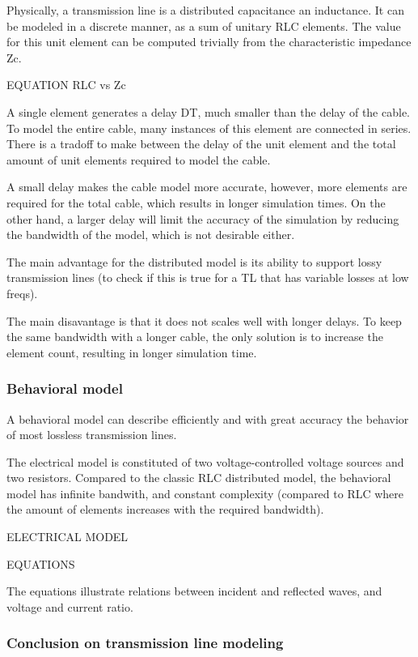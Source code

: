 Physically, a transmission line is a distributed capacitance an inductance.
It can be modeled in a discrete manner, as a sum of unitary RLC elements.
The value for this unit element can be computed trivially from the characteristic impedance \gls{Zc}.

EQUATION RLC vs Zc

A single element generates a delay DT, much smaller than the delay of the cable.
To model the entire cable, many instances of this element are connected in series.
There is a tradoff to make between the delay of the unit element and the total amount of unit elements required to model the cable.

A small delay makes the cable model more accurate, however, more elements are required for the total cable, which results in longer simulation times.
On the other hand, a larger delay will limit the accuracy of the simulation by reducing the bandwidth of the model, which is not desirable either.

The main advantage for the distributed model is its ability to support lossy transmission lines (to check if this is true for a TL that has variable losses at low freqs).

The main disavantage is that it does not scales well with longer delays.
To keep the same bandwidth with a longer cable, the only solution is to increase the element count, resulting in longer simulation time.

\subsubsection{Behavioral model}

A behavioral model can describe efficiently and with great accuracy the behavior of most lossless transmission lines.

The electrical model is constituted of two voltage-controlled voltage sources and two resistors.
Compared to the classic RLC distributed model, the behavioral model has infinite bandwith, and constant complexity (compared to RLC where the amount of elements increases with the required bandwidth).

ELECTRICAL MODEL

EQUATIONS

The equations illustrate relations between incident and reflected waves, and voltage and current ratio.

\subsubsection{Conclusion on transmission line modeling}

